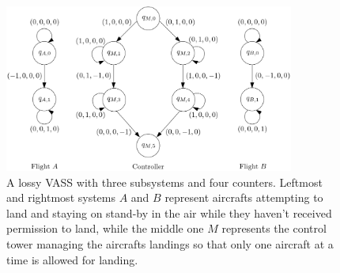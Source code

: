 \begin{center}
	\begin{figure}
			\hspace{0.75cm}
\includegraphics[width=0.85\textwidth]{FigureB}
	\caption{A lossy VASS with three subsystems and four counters. Leftmost and rightmost systems $A$ and $B$ represent aircrafts attempting to land and staying on stand-by in the air while they haven't received permission to land, while the middle one $M$ represents the control tower managing the aircrafts landings so that only one aircraft at a time is allowed for landing.}
					\label{air control}
	\end{figure}
\end{center}

